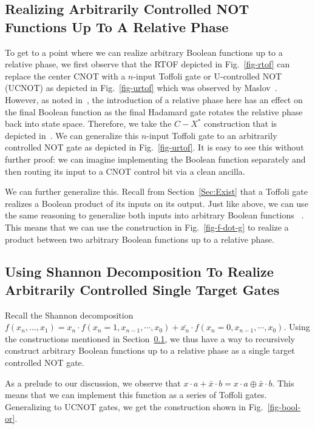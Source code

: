\label{Sec:proposed}
\subsection{Realizing Arbitrarily Controlled NOT Functions Up To A Relative Phase}
\label{Subsec:UNOT}
To get to a point where we can realize arbitrary Boolean functions up to a relative phase, we first observe that the RTOF depicted in Fig.~\ref{fig-rtof} can replace the center CNOT with a $n$-input Toffoli gate or U-controlled NOT (UCNOT) as depicted in Fig.~\ref{fig-urtof} which was observed by Maslov~\cite{bib-rtof-maslov}. However, as noted in~\cite{bib-amy-phase-state}, the introduction of a relative phase here has an effect on the final Boolean function as the final Hadamard gate rotates the relative phase back into state space. Therefore, we take the $C-X^*$ construction that is depicted in~\cite{bib-amy-phase-state}. We can generalize this $n$-input Toffoli gate to an arbitrarily controlled NOT gate as depicted in Fig.~\ref{fig-urtof}. It is easy to see this without further proof: we can imagine implementing the Boolean function separately and then routing its input to a CNOT control bit via a clean ancilla.

We can further generalize this. Recall from Section~\ref{Sec:Exist} that a Toffoli gate realizes a Boolean product of its inputs on its output. Just like above, we can use the same reasoning to generalize both inputs into arbitrary Boolean functions~\cite{bib-amy-phase-state} . This means that we can use the construction in Fig.~\ref{fig-f-dot-g} to realize a product between two arbitrary Boolean functions up to a relative phase. 


\subsection{Using Shannon Decomposition To Realize Arbitrarily Controlled Single Target Gates}

Recall the Shannon decomposition $f(x_n,...,x_1) = x_n \cdot f(x_n=1,x_{n-1},\cdots,x_0) + \bar{x_n} \cdot f(x_n=0,x_{n-1},\cdots,x_0)$. Using the constructions mentioned in Section~\ref{Subsec:UNOT}, we thus have a way to recursively construct arbitrary Boolean functions up to a relative phase as a single target controlled NOT gate.

As a prelude to our discussion, we observe that $x \cdot a  + \bar{x} \cdot b = x \cdot a \oplus \bar{x} \cdot b$. This means that we can implement this function as a series of Toffoli gates. Generalizing to UCNOT gates, we get the construction shown in Fig.~\ref{fig-bool-or}.

